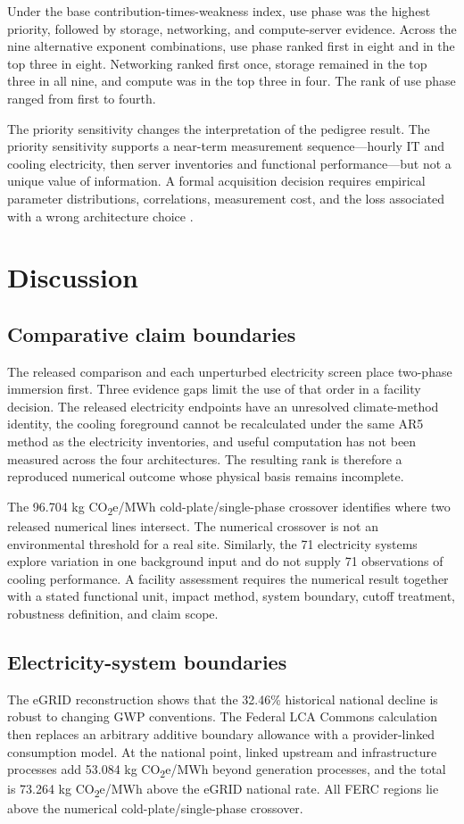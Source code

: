 \documentclass[review,a4paper,fleqn]{cas-sc}
\newcommand{\cotwoe}{CO\textsubscript{2}e}
\begin{document}
Under the base contribution-times-weakness index, use phase was the highest priority, followed by storage, networking, and compute-server evidence. Across the nine alternative exponent combinations, use phase ranked first in eight and in the top three in eight. Networking ranked first once, storage remained in the top three in all nine, and compute was in the top three in four. The rank of use phase ranged from first to fourth.

The priority sensitivity changes the interpretation of the pedigree result. The priority sensitivity supports a near-term measurement sequence---hourly IT and cooling electricity, then server inventories and functional performance---but not a unique value of information. A formal acquisition decision requires empirical parameter distributions, correlations, measurement cost, and the loss associated with a wrong architecture choice \cite{ref34}.

\section{Discussion}
\subsection{Comparative claim boundaries}
The released comparison and each unperturbed electricity screen place two-phase immersion first. Three evidence gaps limit the use of that order in a facility decision. The released electricity endpoints have an unresolved climate-method identity, the cooling foreground cannot be recalculated under the same AR5 method as the electricity inventories, and useful computation has not been measured across the four architectures. The resulting rank is therefore a reproduced numerical outcome whose physical basis remains incomplete.

The 96.704 kg \cotwoe{}/MWh cold-plate/single-phase crossover identifies where two released numerical lines intersect. The numerical crossover is not an environmental threshold for a real site. Similarly, the 71 electricity systems explore variation in one background input and do not supply 71 observations of cooling performance. A facility assessment requires the numerical result together with a stated functional unit, impact method, system boundary, cutoff treatment, robustness definition, and claim scope.

\subsection{Electricity-system boundaries}
The eGRID reconstruction shows that the 32.46\% historical national decline is robust to changing GWP conventions. The Federal LCA Commons calculation then replaces an arbitrary additive boundary allowance with a provider-linked consumption model. At the national point, linked upstream and infrastructure processes add 53.084 kg \cotwoe{}/MWh beyond generation processes, and the total is 73.264 kg \cotwoe{}/MWh above the eGRID national rate. All FERC regions lie above the numerical cold-plate/single-phase crossover.
\end{document}
